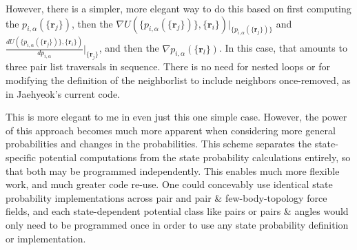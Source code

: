 \documentclass[11pt, oneside]{article}   	%
\begin{document}
However, there is a simpler, more elegant way to do this based on first computing the $p_{i, \alpha}(\{\mathbf{r}_j\})$, then the $\nabla U(\{p_{i, \alpha}(\{\mathbf{r}_j\})\}, \{\mathbf{r}_i\}) |_{\{p_{i, \alpha}(\{\mathbf{r}_j\})\}}$ and $\frac{d U(\{p_{i, \alpha}(\{\mathbf{r}_j\})\}, \{\mathbf{r}_i\})}{d p_{i, \alpha}} |_{\{\mathbf{r}_j\}}$, and then the 
$\nabla p_{i, \alpha}(\{\mathbf{r}_l\})$. In this case, that amounts to three pair list traversals in sequence. There is no need for nested loops or for modifying the definition of the neighborlist to include neighbors once-removed, as in Jaehyeok's current code.

This is more elegant to me in even just this one simple case. However, the power of this approach becomes much more apparent when considering more general probabilities and changes in the probabilities. This scheme separates the state-specific potential computations from the state probability calculations entirely, so that both may be programmed independently. This enables much more flexible work, and much greater code re-use. One could concevably use identical state probability implementations across pair and pair \& few-body-topology force fields, and each state-dependent potential class like pairs or pairs \& angles would only need to be programmed once in order to use any state probability definition or implementation.
\end{document}
